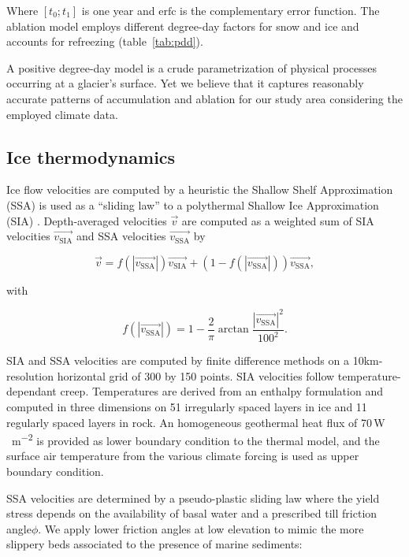 Where $[t_0; t_1]$ is one year and $\mathrm{erfc}$ is the complementary error function. The ablation model employs different degree-day factors for snow and ice and accounts for refreezing (table~\ref{tab:pdd}).

A positive degree-day model is a crude parametrization of physical processes occurring at a glacier's surface. Yet we believe that it captures reasonably accurate patterns of accumulation and ablation for our study area considering the employed climate data.

\subsection{Ice thermodynamics}

Ice flow velocities are computed by a heuristic the Shallow Shelf Approximation (SSA) is used as a ``sliding law'' to a polythermal Shallow Ice Approximation (SIA) \citep{bueler-brown-2009}. Depth-averaged velocities $\vec{v}$ are computed as a weighted sum of SIA velocities $\vec{v_{\mathrm{SIA}}}$ and SSA velocities $\vec{v_{\mathrm{SSA}}}$ by

\begin{equation}
	\vec{v} = f(|\vec{v_{\mathrm{SSA}}}|)\vec{v_{\mathrm{SIA}}}
  + (1-f(|\vec{v_{\mathrm{SSA}}}|))\vec{v_{\mathrm{SSA}}},
\end{equation}

with

\begin{equation}
	f(|\vec{v_{\mathrm{SSA}}}|) = 1
	- \frac{2}{\pi}\arctan{\frac{|\vec{v_{\mathrm{SSA}}}|^2}{100^2}}.
\end{equation}

SIA and SSA velocities are computed by finite difference methods on a 10km-resolution horizontal grid of 300 by 150 points. SIA velocities follow temperature-dependant creep. Temperatures are derived from an enthalpy formulation \citep{aschwanden-etal-2012} and computed in three dimensions on 51 irregularly spaced layers in ice and 11 regularly spaced layers in rock. An homogeneous geothermal heat flux of 70\,\unit{W\,m^{-2}} is provided as lower boundary condition to the thermal model, and the surface air temperature from the various climate forcing is used as upper boundary condition.

SSA velocities are determined by a pseudo-plastic sliding law where the yield stress depends on the availability of basal water and a prescribed till friction angle$\phi$. We apply lower friction angles at low elevation to mimic the more slippery beds associated to the presence of marine sediments:

